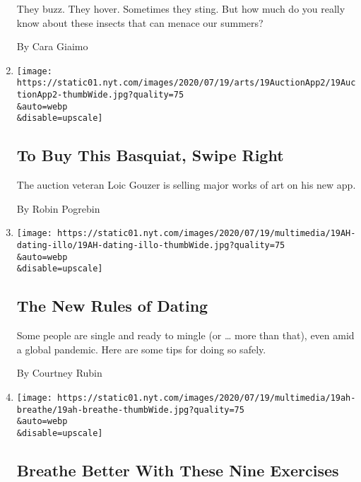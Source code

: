\begin{enumerate}
  They buzz. They hover. Sometimes they sting. But how much do you
  really know about these insects that can menace our summers?

  By Cara Giaimo
\item
  \href{/2020/07/19/arts/design/swipe-right-buy-basquiat.html}{}

  \texttt{[image: https://static01.nyt.com/images/2020/07/19/arts/19AuctionApp2/19AuctionApp2-thumbWide.jpg?quality=75\\\&auto=webp\\\&disable=upscale]}

  \hypertarget{to-buy-this-basquiat-swipe-right}{%
  \subsection{To Buy This Basquiat, Swipe
  Right}\label{to-buy-this-basquiat-swipe-right}}

  The auction veteran Loic Gouzer is selling major works of art on his
  new app.

  By Robin Pogrebin
\item
  \href{/2020/07/18/at-home/coronavirus-pandemic-dating.html}{}

  \texttt{[image: https://static01.nyt.com/images/2020/07/19/multimedia/19AH-dating-illo/19AH-dating-illo-thumbWide.jpg?quality=75\\\&auto=webp\\\&disable=upscale]}

  \hypertarget{the-new-rules-of-dating}{%
  \subsection{The New Rules of Dating}\label{the-new-rules-of-dating}}

  Some people are single and ready to mingle (or \ldots{} more than
  that), even amid a global pandemic. Here are some tips for doing so
  safely.

  By Courtney Rubin
\item
  \href{/2020/07/18/at-home/coronavirus-breathing-exercises.html}{}

  \texttt{[image: https://static01.nyt.com/images/2020/07/19/multimedia/19ah-breathe/19ah-breathe-thumbWide.jpg?quality=75\\\&auto=webp\\\&disable=upscale]}

  \hypertarget{breathe-better-with-these-nine-exercises}{%
  \subsection{Breathe Better With These Nine
  Exercises}\label{breathe-better-with-these-nine-exercises}}


\end{enumerate}
